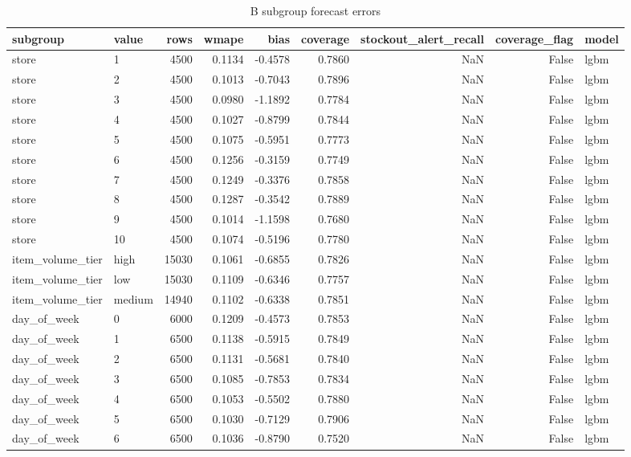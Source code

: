 \begin{table}
\caption{B subgroup forecast errors}
\label{tab:subgroup-errors-B}
\begin{tabular}{llrrrrrrl}
\toprule
subgroup & value & rows & wmape & bias & coverage & stockout\_alert\_recall & coverage\_flag & model \\
\midrule
store & 1 & 4500 & 0.1134 & -0.4578 & 0.7860 & NaN & False & lgbm \\
store & 2 & 4500 & 0.1013 & -0.7043 & 0.7896 & NaN & False & lgbm \\
store & 3 & 4500 & 0.0980 & -1.1892 & 0.7784 & NaN & False & lgbm \\
store & 4 & 4500 & 0.1027 & -0.8799 & 0.7844 & NaN & False & lgbm \\
store & 5 & 4500 & 0.1075 & -0.5951 & 0.7773 & NaN & False & lgbm \\
store & 6 & 4500 & 0.1256 & -0.3159 & 0.7749 & NaN & False & lgbm \\
store & 7 & 4500 & 0.1249 & -0.3376 & 0.7858 & NaN & False & lgbm \\
store & 8 & 4500 & 0.1287 & -0.3542 & 0.7889 & NaN & False & lgbm \\
store & 9 & 4500 & 0.1014 & -1.1598 & 0.7680 & NaN & False & lgbm \\
store & 10 & 4500 & 0.1074 & -0.5196 & 0.7780 & NaN & False & lgbm \\
item\_volume\_tier & high & 15030 & 0.1061 & -0.6855 & 0.7826 & NaN & False & lgbm \\
item\_volume\_tier & low & 15030 & 0.1109 & -0.6346 & 0.7757 & NaN & False & lgbm \\
item\_volume\_tier & medium & 14940 & 0.1102 & -0.6338 & 0.7851 & NaN & False & lgbm \\
day\_of\_week & 0 & 6000 & 0.1209 & -0.4573 & 0.7853 & NaN & False & lgbm \\
day\_of\_week & 1 & 6500 & 0.1138 & -0.5915 & 0.7849 & NaN & False & lgbm \\
day\_of\_week & 2 & 6500 & 0.1131 & -0.5681 & 0.7840 & NaN & False & lgbm \\
day\_of\_week & 3 & 6500 & 0.1085 & -0.7853 & 0.7834 & NaN & False & lgbm \\
day\_of\_week & 4 & 6500 & 0.1053 & -0.5502 & 0.7880 & NaN & False & lgbm \\
day\_of\_week & 5 & 6500 & 0.1030 & -0.7129 & 0.7906 & NaN & False & lgbm \\
day\_of\_week & 6 & 6500 & 0.1036 & -0.8790 & 0.7520 & NaN & False & lgbm \\

\end{tabular}
\end{table}
